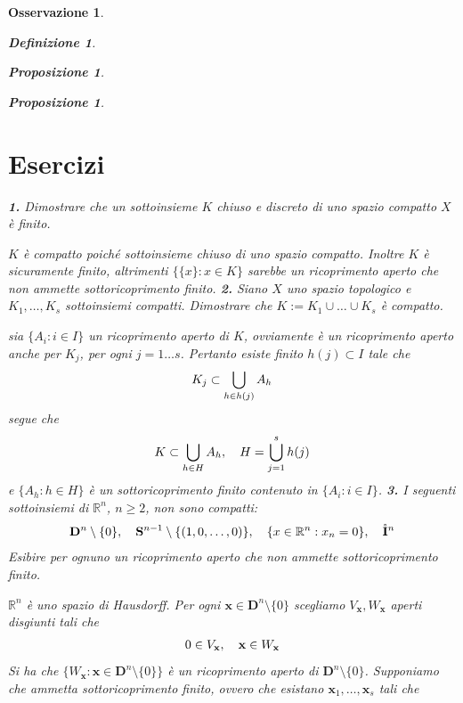 \documentclass[oneside, 11pt]{amsbook}
\makeatletter
\newcommand{\0}{{(0)}}
\newcommand{\3}{{(3)}}
\theoremstyle{colonplain}
\newtheorem{prop}[thm]{Proposizione}
\theoremstyle{colondefinition}
\newtheorem{defn}[thm]{Definizione}
\theoremstyle{colonremark}
\newtheorem{rmk}[thm]{Osservazione}
\numberwithin{equation}{chapter}
\renewcommand{\proofname}{Dimostrazione}
\renewenvironment{proof}[1][\proofname]{\par
  \pushQED{\end{proof}}%
  \normalfont \topsep6\p@\@plus6\p@\relax
  \trivlist
  \item[\hskip\labelsep\bfseries #1:]\ignorespaces
}{%
  \popQED\endtrivlist\@endpefalse
}
\makeatother
\begin{document}
\begin{rmk}
\begin{defn}
\begin{prop}
\begin{prop}
\section{Esercizi}
\textbf{1.} Dimostrare che un sottoinsieme $K$ chiuso e discreto di uno spazio compatto $X$ è finito.
\begin{proof}[Soluzione]
$K$ è compatto poiché sottoinsieme chiuso di uno spazio compatto. Inoltre $K$ è sicuramente finito, altrimenti $\{ \{ x \} : x \in K \}$ sarebbe un ricoprimento aperto che non ammette sottoricoprimento finito.
\end{proof}
\textbf{2.} Siano $X$ uno spazio topologico e $K_1, \dots, K_s$ sottoinsiemi compatti. Dimostrare che $K := K_1 \cup \dots \cup K_s$ è compatto.
\begin{proof}[Soluzione]
sia $\{ A_i : i \in I \}$ un ricoprimento aperto di $K$, ovviamente è un ricoprimento aperto anche per $K_j$, per ogni $j = 1 \dots s$. Pertanto esiste finito $h(j) \subset I$ tale che
\begin{align}
    K_j \subset \bigcup_{h \in h(j)} A_h \notag
\end{align}
segue che
\begin{align}
    K \subset \bigcup_{h \in H} A_h, \quad H = \bigcup_{j = 1}^s h(j) \notag
\end{align}
e $\{ A_h : h \in H \}$ è un sottoricoprimento finito contenuto in $\{ A_i : i \in I \}$.
\end{proof}
\textbf{3.} I seguenti sottoinsiemi di $\mathbb{R}^n$, $n \geq 2$, non sono compatti:
\begin{align}
    \mathbf{D}^n \setminus \{ 0 \}, \quad \mathbf{S}^{n - 1} \setminus \{ (1, 0, \dots, 0) \}, \quad \{ x \in \mathbb{R}^n : x_n = 0 \}, \quad \mathring{\mathbf{I}}^n \notag
\end{align}
Esibire per ognuno un ricoprimento aperto che non ammette sottoricoprimento finito.
\begin{proof}[Soluzione]
$\mathbb{R}^n$ è uno spazio di Hausdorff. Per ogni $\mathbf{x} \in \mathbf{D}^n \setminus \{ 0 \}$ scegliamo $V_\mathbf{x}, W_\mathbf{x}$ aperti disgiunti tali che
\begin{align}
    0 \in V_\mathbf{x}, \quad \mathbf{x} \in W_\mathbf{x} \notag
\end{align}
Si ha che $\{ W_\mathbf{x} : \mathbf{x} \in \mathbf{D}^n \setminus \{ 0 \} \}$ è un ricoprimento aperto di $\mathbf{D}^n \setminus \{ 0 \}$. Supponiamo che ammetta sottoricoprimento finito, ovvero che esistano $\mathbf{x}_1, \dots, \mathbf{x}_s$ tali che
\begin{align}

\end{align}
\end{proof}
\end{prop}
\end{prop}
\end{defn}
\end{rmk}
\end{document}
